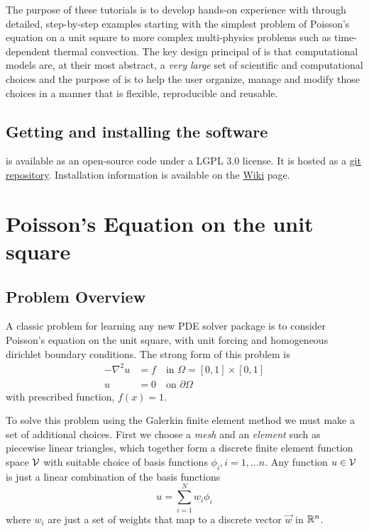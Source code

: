 \documentclass[10pt,twoside,openright]{memoir}
\begin{document}
The purpose of these tutorials is to develop hands-on experience with
\TF{} through detailed, step-by-step examples starting with the
simplest problem of Poisson's equation on a unit square to more
complex multi-physics problems such as time-dependent thermal
convection.  The key design principal of \TF{} is that computational
models are, at their most abstract, a \emph{very large} set of
scientific and computational choices and the purpose of \TF{} is to
help the user organize, manage and modify those choices in a manner
that is flexible, reproducible and reusable.

\section{Getting and installing the \TF{} software}
\label{sec:gett-inst-tf}

\TF{} is available as an open-source code under a LGPL 3.0
license.  It is hosted as a
\href{https://bitbucket.org/tferma/tferma}{git repository}.
Installation information is available on the
\href{https://bitbucket.org/tferma/tferma/wiki}{Wiki} page. 

\chapter{Poisson's Equation on the unit square}

\section{Problem Overview}
\label{sec:problem-formulation}

A classic problem for learning any new PDE solver package is to
consider  Poisson's equation on the unit square,  with unit
forcing and homogeneous dirichlet boundary conditions.  The strong
form of this problem is
\begin{align}
-\nabla^2u &= f \quad\text{in } \Omega=[0,1]\times[0,1]\\
u &= 0 \quad\text{on } \partial\Omega
\end{align}
with  prescribed function, $f(x)=1$. 

To solve this problem using the Galerkin finite element method we must make a set of
additional choices. First we choose a \emph{mesh} and an \emph{element} such as
piecewise linear triangles, which together form a discrete finite
element function space $\mathcal{V}$ with suitable choice of basis
functions $\phi_{i}, i=1,\ldots n$. Any function $u\in\mathcal{V}$ is just a
linear combination of the basis functions
\begin{equation}
  \label{eq:6}
  u = \sum_{i=1}^{N} w_{i}\phi_{i}
\end{equation}
where $w_{i}$ are just a set of weights that map to a discrete vector $\vec{w}$ in $\mathbb{R}^n{}$.
\end{document}
